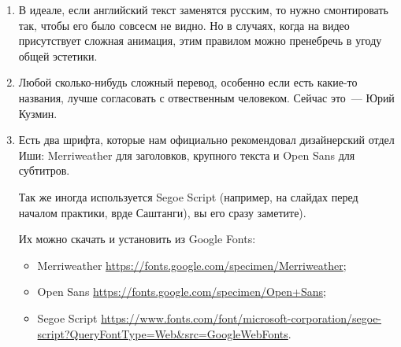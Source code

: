 \documentclass[
a4paper, %
12pt, %
article,
onecolumn, %
openany, %
]{memoir}
\begin{document}
\begin{enumerate}
\item В идеале, если английский текст заменятся русским, то нужно смонтировать так, чтобы его было совсесм не видно. Но в случаях, когда на видео присутствует сложная анимация, этим правилом можно пренебречь в угоду общей эстетики.

\item Любой сколько-нибудь сложный перевод, особенно если есть какие-то названия, лучше согласовать с отвественным человеком. Сейчас это~--- Юрий Кузмин.
\item Есть два шрифта, которые нам официально рекомендовал дизайнерский отдел Иши: Merriweather для заголовков, крупного текста и Open Sans для субтитров.

    Так же иногда используется Segoe Script (например, на слайдах перед началом практики, врде Саштанги), вы его сразу заметите).

    Их можно скачать и установить из Google Fonts:
    \begin{itemize}
        \item  Merriweather \href{https://fonts.google.com/specimen/Merriweather}{\small https://fonts.google.com/specimen/Merriweather};
        \item Open Sans \href{https://fonts.google.com/specimen/Open+Sans}{\small https://fonts.google.com/specimen/Open+Sans};
    \item Segoe Script \href{https://www.fonts.com/font/microsoft-corporation/segoe-script?QueryFontType=Web&src=GoogleWebFonts}{\small https://www.fonts.com/font/microsoft-corporation/segoe-script?QueryFontType=Web\&src=GoogleWebFonts}.
      \end{itemize}
\end{enumerate}
\end{document}
